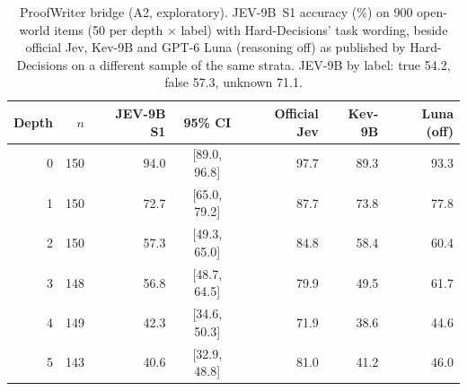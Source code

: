 \begin{table}[t]
\centering\small
\caption{ProofWriter bridge (A2, exploratory). JEV-9B~S1 accuracy (\%) on 900 open-world items (50 per depth $\times$ label) with Hard-Decisions' task wording, beside official Jev, Kev-9B and GPT-6 Luna (reasoning off) as published by Hard-Decisions on a different sample of the same strata. JEV-9B by label: true 54.2, false 57.3, unknown 71.1.}
\label{tab:bridge}
\begin{tabular}{@{}rrrcrrr@{}}
\toprule
Depth & $n$ & JEV-9B S1 & 95\% CI & Official Jev & Kev-9B & Luna (off) \\
\midrule
0 & 150 & 94.0 & [89.0, 96.8] & 97.7 & 89.3 & 93.3 \\
1 & 150 & 72.7 & [65.0, 79.2] & 87.7 & 73.8 & 77.8 \\
2 & 150 & 57.3 & [49.3, 65.0] & 84.8 & 58.4 & 60.4 \\
3 & 148 & 56.8 & [48.7, 64.5] & 79.9 & 49.5 & 61.7 \\
4 & 149 & 42.3 & [34.6, 50.3] & 71.9 & 38.6 & 44.6 \\
5 & 143 & 40.6 & [32.9, 48.8] & 81.0 & 41.2 & 46.0 \\
\bottomrule
\end{tabular}
\end{table}
